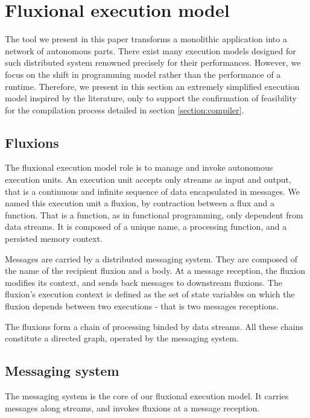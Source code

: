 \section{Fluxional execution model} \label{section:model}

The tool we present in this paper transforms a monolithic application into a network of autonomous parts.
There exist many execution models designed for such distributed system renowned precisely for their performances.
However, we focus on the shift in programming model rather than the performance of a runtime.
Therefore, we present in this section an extremely simplified execution model inspired by the literature\cite{Welsh2000, Jain2006, Wu2007, Zaharia2010, Akidau2013, Marz2011}, only to support the confirmation of feasibility for the compilation process detailed in section \ref{section:compiler}.

\subsection{Fluxions}

The fluxional execution model role is to manage and invoke autonomous execution units.
An execution unit accepts only streams as input and output, that is a continuous and infinite sequence of data encapsulated in messages.
We named this execution unit a fluxion, by contraction between a flux and a function.
That is a function, as in functional programming, only dependent from data streams.
It is composed of a unique name, a processing function, and a persisted memory context.

Messages are carried by a distributed messaging system.
They are composed of the name of the recipient fluxion and a body.
At a message reception, the fluxion modifies its context, and sends back messages to downstream fluxions.
The fluxion's execution context is defined as the set of state variables on which the fluxion depends between two executions - that is two messages receptions.

The fluxions form a chain of processing binded by data streams.
All these chains constitute a directed graph, operated by the messaging system.

\subsection{Messaging system}

The messaging system is the core of our fluxional execution model.
It carries messages along streams, and invokes fluxions at a message reception.

